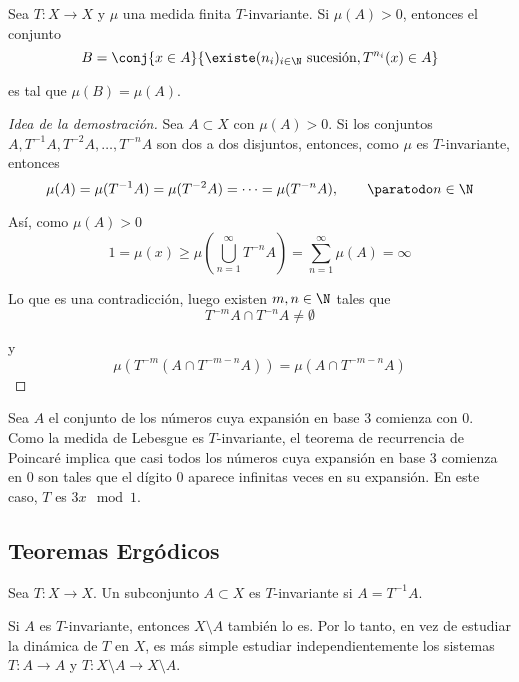 \documentclass[	docname= Sistemas\ Din\'amicos,
				finished=1,
				semester=1,
				year=2017,
				professor=Godofredo\ Iommi,
				sigla=MAT2565]{apunte}
\begin{document}
\begin{teo} Sea $T: X \to X$ y $\mu$ una medida finita $T$-invariante. Si $\mu(A) > 0$, entonces el conjunto
	$$B = \conj{x \in A}{\existe (n_{i})_{i \in \N} \text{ sucesión}, T^{n_{i}}(x) \in A}$$

es tal que $\mu(B) = \mu(A)$.
\end{teo}

\begin{proof}[Idea de la demostración] Sea $A \subset X$ con $\mu(A) > 0$. Si los conjuntos $A, T^{-1}A, T^{-2}A, \ldots, T^{-n}A$ son dos a dos disjuntos, entonces, como $\mu$ es $T$-invariante, entonces
	$$\mu(A) = \mu(T^{-1}A) = \mu(T^{-2}A) = \cdots = \mu(T^{-n}A), \qquad \paratodo n \in \N$$
			
Así, como $\mu(A) > 0$
	$$1 = \mu(x) \geq \mu\left(\bigcup_{n=1}^{\infty} T^{-n}A\right) = \sum_{n=1}^{\infty} \mu(A) = \infty$$

Lo que es una contradicción, luego existen $m,n \in \N$ tales que
	$$T^{-m}A \cap T^{-n}A \neq \emptyset$$
	
y
	$$\mu(T^{-m}(A \cap T^{-m-n}A)) = \mu(A \cap T^{-m-n}A)$$

\end{proof}

\begin{ex} Sea $A$ el conjunto de los números cuya expansión en base 3 comienza con 0. Como la medida de Lebesgue es $T$-invariante, el teorema de recurrencia de Poincaré implica que casi todos los números cuya expansión en base 3 comienza en 0 son tales que el dígito 0 aparece infinitas veces en su expansión. En este caso, $T$ es $3x \mod 1$.
\end{ex}

\subsection{Teoremas Ergódicos}

\begin{defn}Sea $T: X \to X$. Un subconjunto $A \subset X$ es $T$-invariante si $A = T^{-1}A$.
\end{defn}

\begin{obsd} Si $A$ es $T$-invariante, entonces $X \setminus A$ también lo es. Por lo tanto, en vez de estudiar la dinámica de $T$ en $X$, es más simple estudiar independientemente los sistemas $T: A \to A$ y $T: X \setminus A \to X \setminus A$.
\end{obsd}
\end{document}
